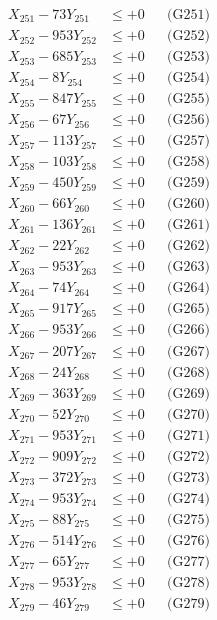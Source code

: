 \documentclass[a4paper,10pt]{article}
\begin{document}
{\begin{align}
\allowbreak
X_{251} - 73Y_{251} &\leq +0 && \text{(G251)} \\
X_{252} - 953Y_{252} &\leq +0 && \text{(G252)} \\
X_{253} - 685Y_{253} &\leq +0 && \text{(G253)} \\
X_{254} - 8Y_{254} &\leq +0 && \text{(G254)} \\
X_{255} - 847Y_{255} &\leq +0 && \text{(G255)} \\
X_{256} - 67Y_{256} &\leq +0 && \text{(G256)} \\
X_{257} - 113Y_{257} &\leq +0 && \text{(G257)} \\
X_{258} - 103Y_{258} &\leq +0 && \text{(G258)} \\
X_{259} - 450Y_{259} &\leq +0 && \text{(G259)} \\
X_{260} - 66Y_{260} &\leq +0 && \text{(G260)} \\
\allowbreak
X_{261} - 136Y_{261} &\leq +0 && \text{(G261)} \\
X_{262} - 22Y_{262} &\leq +0 && \text{(G262)} \\
X_{263} - 953Y_{263} &\leq +0 && \text{(G263)} \\
X_{264} - 74Y_{264} &\leq +0 && \text{(G264)} \\
X_{265} - 917Y_{265} &\leq +0 && \text{(G265)} \\
X_{266} - 953Y_{266} &\leq +0 && \text{(G266)} \\
X_{267} - 207Y_{267} &\leq +0 && \text{(G267)} \\
X_{268} - 24Y_{268} &\leq +0 && \text{(G268)} \\
X_{269} - 363Y_{269} &\leq +0 && \text{(G269)} \\
X_{270} - 52Y_{270} &\leq +0 && \text{(G270)} \\
\allowbreak
X_{271} - 953Y_{271} &\leq +0 && \text{(G271)} \\
X_{272} - 909Y_{272} &\leq +0 && \text{(G272)} \\
X_{273} - 372Y_{273} &\leq +0 && \text{(G273)} \\
X_{274} - 953Y_{274} &\leq +0 && \text{(G274)} \\
X_{275} - 88Y_{275} &\leq +0 && \text{(G275)} \\
X_{276} - 514Y_{276} &\leq +0 && \text{(G276)} \\
X_{277} - 65Y_{277} &\leq +0 && \text{(G277)} \\
X_{278} - 953Y_{278} &\leq +0 && \text{(G278)} \\
X_{279} - 46Y_{279} &\leq +0 && \text{(G279)} \\

\end{align}}
\end{document}

